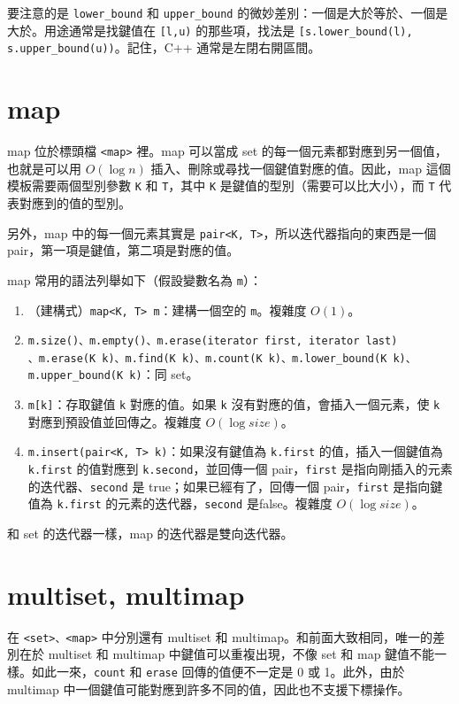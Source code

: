 \documentclass[a4paper, 11pt, oneside]{book}
\begin{document}
要注意的是 \texttt{lower\_bound} 和 \texttt{upper\_bound} 的微妙差別：一個是大於等於、一個是大於。用途通常是找鍵值在 \texttt{[l,u)} 的那些項，找法是 \texttt{[s.lower\_bound(l), s.upper\_bound(u))}。記住，C++ 通常是左閉右開區間。

\section{map}
map 位於標頭檔 \texttt{<map>} 裡。map 可以當成 set 的每一個元素都對應到另一個值，也就是可以用 $O(\log n)$ 插入、刪除或尋找一個鍵值對應的值。因此，map 這個模板需要兩個型別參數 \texttt{K} 和 \texttt{T}，其中 \texttt{K} 是鍵值的型別（需要可以比大小），而 \texttt{T} 代表對應到的值的型別。

另外，map 中的每一個元素其實是 \texttt{pair<K, T>}，所以迭代器指向的東西是一個 pair，第一項是鍵值，第二項是對應的值。

map 常用的語法列舉如下（假設變數名為 \texttt{m}）：

\begin{enumerate}
    \item （建構式）\texttt{map<K, T> m}：建構一個空的 \texttt{m}。複雜度 $O(1)$。
    \item \texttt{m.size()、m.empty()、m.erase(iterator first, iterator last)}\\\texttt{、m.erase(K k)、m.find(K k)、m.count(K k)、m.lower\_bound(K k)、m.upper\_bound(K k)}：同 set。
    \item \texttt{m[k]}：存取鍵值 \texttt{k} 對應的值。如果 \texttt{k} 沒有對應的值，會插入一個元素，使 \texttt{k} 對應到預設值並回傳之。複雜度 $O(\log size)$。
    \item \texttt{m.insert(pair<K, T> k)}：如果沒有鍵值為 \texttt{k.first} 的值，插入一個鍵值為 \texttt{k.first} 的值對應到 \texttt{k.second}，並回傳一個 pair，\texttt{first} 是指向剛插入的元素的迭代器、\texttt{second} 是 true；如果已經有了，回傳一個 pair，\texttt{first} 是指向鍵值為 \texttt{k.first} 的元素的迭代器，\texttt{second} 是false。複雜度 $O(\log size)$。
\end{enumerate}

和 set 的迭代器一樣，map 的迭代器是雙向迭代器。

\section{multiset, multimap}

在 \texttt{<set>、<map>} 中分別還有 multiset 和 multimap。和前面大致相同，唯一的差別在於 multiset 和 multimap 中鍵值可以重複出現，不像 set 和 map 鍵值不能一樣。如此一來，\texttt{count} 和 \texttt{erase} 回傳的值便不一定是 0 或 1。此外，由於 multimap 中一個鍵值可能對應到許多不同的值，因此也不支援下標操作。
\end{document}
